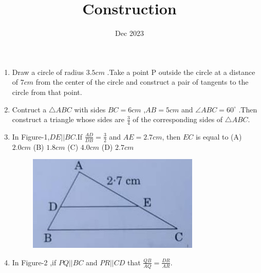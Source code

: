 \documentclass{article}
\title{Construction}
\date{Dec 2023}
\begin{document}
\maketitle
\begin{enumerate}
\item Draw a circle of radius $3.5cm$ .Take a point P outside the circle at a distance of $7cm$ from the center of the circle and construct a pair of tangents to the circle from that point.

\item Contruct a $\bigtriangleup ABC $ with sides $BC = 6cm$ ,$AB = 5cm$ and $\angle ABC = 60^{\circ}$ .Then construct a triangle whose sides are $\frac{3}{4}$ of the corresponding sides of $\bigtriangleup ABC$.

\item In Figure-1,$DE || BC $.If $\frac{AD}{DB}=\frac{3}{2}$ and $AE = 2.7cm$, then $EC$ is equal to
	(A) $2.0cm$ \newline
	(B) $1.8cm$ \newline
	(C) $4.0cm$ \newline
	(D) $2.7cm$ \newline
	
	\begin{figure}[h]
		\centering
		\includegraphics[width=\columnwidth]{figs/Construction.jpg}
		\caption{}
	\end{figure}

\item In Figure-2 ,if $PQ || BC$ and $PR || CD$ that $\frac{QB}{AQ} = \frac{DR}{AR}$.

\end{enumerate}
\end{document}

